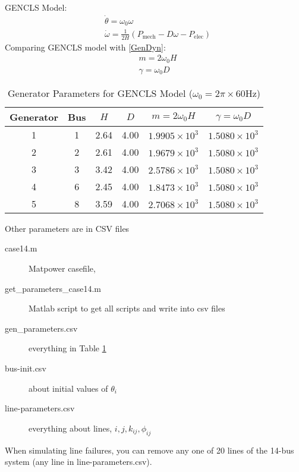 \documentclass[a4paper,11pt]{article}
\begin{document}
GENCLS Model:
\begin{subequations}
\begin{align}
& \dot{\theta}  = \omega_0 \omega \\
& \dot{\omega} = \frac{1}{2H}(P_{\text{mech}} - D \omega - P_{\text{elec}})
\end{align}
\end{subequations}
Comparing GENCLS model with \eqref{GenDyn}:
\begin{subequations}
\begin{align}
& m = 2\omega_0 H \\
& \gamma = \omega_0 D
\end{align}
\end{subequations}
\begin{table}[tb]
	\caption{Generator Parameters for GENCLS Model ($\omega_0 = 2\pi\times 60\text{Hz}$)}
	\label{tab:GENCLS_Parameters}
	\centering

	\begin{tabular}{c|c|cccc}
	\hline

	\hline
	\textbf{Generator} & \textbf{Bus} & $H$ & $D$ & $m = 2\omega_0 H$ & $\gamma = \omega_0 D$ \\
	\hline
	1	 & 1 & 2.64 & 4.00 & $1.9905 \times 10^3$ & $1.5080 \times 10^3$ \\
	2	 & 2 & 2.61 & 4.00 & $1.9679 \times 10^3$ & $1.5080 \times 10^3$ \\
	3	 & 3 & 3.42 & 4.00 & $2.5786 \times 10^3$ & $1.5080 \times 10^3$ \\
	4	 & 6 & 2.45 & 4.00 & $1.8473 \times 10^3$ & $1.5080 \times 10^3$ \\
	5	 & 8 & 3.59 & 4.00 & $2.7068 \times 10^3$ & $1.5080 \times 10^3$ \\
	\hline

	\hline
	\end{tabular}
\end{table}
Other parameters are in CSV files
\begin{description}
\item[case14.m] Matpower casefile,
\item[get\_parameters\_case14.m] Matlab script to get all scripts and write into csv files
\item[gen\_parameters.csv] everything in Table \ref{tab:GENCLS_Parameters}
\item[bus-init.csv] about initial values of $\theta_i$
\item[line-parameters.csv] everything about lines, $i,j,k_{ij},\phi_{ij}$
\end{description}
When simulating line failures, you can remove any one of 20 lines of the 14-bus system (any line in line-parameters.csv). 
\end{document}
